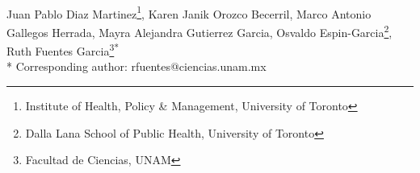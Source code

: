 \documentclass[10pt,letterpaper]{article}
\begin{document}
\vspace*{0.2in}

\begin{flushleft}
{\Large
\textbf{} %
}
\newline
\\
Juan Pablo Diaz Martinez\footnote{Institute of Health, Policy \&
  Management, University of Toronto}\textsuperscript{},
Karen Janik Orozco Becerril\textsuperscript{},
Marco Antonio Gallegos Herrada\textsuperscript{},
Mayra Alejandra Gutierrez Garcia\textsuperscript{},
Osvaldo Espin-Garcia\footnote{Dalla Lana School of Public Health,
  University of Toronto}\textsuperscript{},
Ruth Fuentes Garcia\footnote{Facultad de Ciencias, UNAM}\textsuperscript{}\textsuperscript{*}\\
\bigskip
\bigskip
* Corresponding author: rfuentes@ciencias.unam.mx\\
\end{flushleft}
\end{document}
